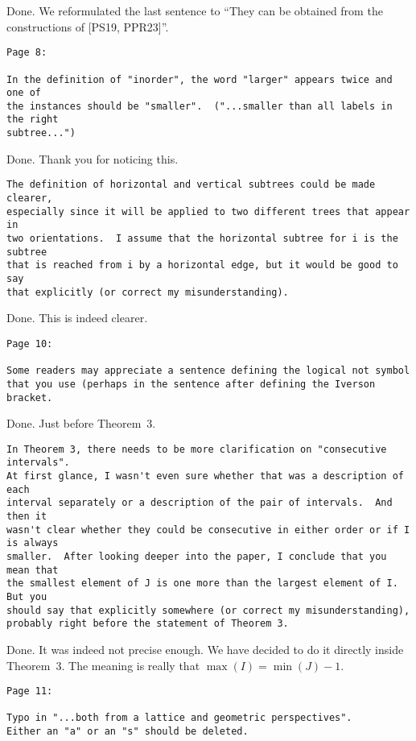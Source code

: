 \documentclass{article}
\begin{document}
Done. We reformulated the last sentence to ``They can be obtained from the constructions of [PS19, PPR23]''.

\begin{verbatim}
Page 8:

In the definition of "inorder", the word "larger" appears twice and one of 
the instances should be "smaller".  ("...smaller than all labels in the right 
subtree...")
\end{verbatim}

Done. Thank you for noticing this.

\begin{verbatim}
The definition of horizontal and vertical subtrees could be made clearer, 
especially since it will be applied to two different trees that appear in 
two orientations.  I assume that the horizontal subtree for i is the subtree 
that is reached from i by a horizontal edge, but it would be good to say 
that explicitly (or correct my misunderstanding).
\end{verbatim}

Done. This is indeed clearer.

\begin{verbatim}
Page 10:

Some readers may appreciate a sentence defining the logical not symbol 
that you use (perhaps in the sentence after defining the Iverson bracket.
\end{verbatim}

Done. Just before Theorem~3.

\begin{verbatim}
In Theorem 3, there needs to be more clarification on "consecutive intervals".  
At first glance, I wasn't even sure whether that was a description of each 
interval separately or a description of the pair of intervals.  And then it 
wasn't clear whether they could be consecutive in either order or if I is always 
smaller.  After looking deeper into the paper, I conclude that you mean that 
the smallest element of J is one more than the largest element of I.  But you 
should say that explicitly somewhere (or correct my misunderstanding), 
probably right before the statement of Theorem 3.
\end{verbatim}

Done. It was indeed not precise enough. We have decided to do it directly inside Theorem~3. The meaning is really that $\max(I) = \min(J)-1$.

\begin{verbatim}
Page 11:

Typo in "...both from a lattice and geometric perspectives".  
Either an "a" or an "s" should be deleted.
\end{verbatim}
\end{document}
